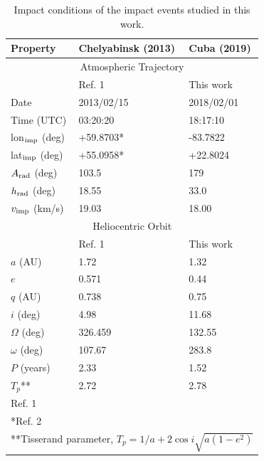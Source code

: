 \documentclass[fleqn,usenatbib]{mnras}
\newcommand{\sub}[1]{_{\rm #1}}
\newcommand{\vimp}{v\sub{imp}}
\begin{document}
\begin{table}
\centering
\begin{tabular}{lll}
\hline\hline
Property & Chelyabinsk (2013) & Cuba (2019)\\
\hline
\multicolumn{3}{c}{Atmospheric Trajectory}\\
\hline
                &  Ref. 1 & This work \\
Date            & 2013/02/15 & 2018/02/01 \\
Time (UTC)      & 03:20:20 & 18:17:10 \\
lon$_{\rm imp}$ (deg)       & +59.8703* & -83.7822 \\
lat$_{\rm imp}$ (deg)       & +55.0958* & +22.8024 \\
$A_{\rm rad}$ (deg)         & 103.5 & 179 \\
$h_{\rm rad}$ (deg)         & 18.55 & 33.0 \\
$\vimp$ (km/s)  & 19.03 & 18.00 \\
\hline
\multicolumn{3}{c}{Heliocentric Orbit}\\
\hline
                & Ref. 1 & This work \\
$a$ (AU)        & 1.72 & 1.32 \\
$e$             & 0.571 & 0.44 \\
$q$ (AU)        & 0.738 & 0.75 \\
$i$ (deg)       & 4.98 & 11.68 \\
$\Omega$ (deg)  & 326.459 & 132.55 \\
$\omega$ (deg)  & 107.67 & 283.8 \\
$P$ (years)     & 2.33 & 1.52 \\ 
$T_p$**           & 2.72 & 2.78 \\ 
\hline\hline
\multicolumn{3}{l}{\footnotesize Ref. 1 \citealt{Borovivcka2013}}\\
\multicolumn{3}{l}{*Ref. 2 \citealt{Zuluaga2013}}\\
\multicolumn{3}{l}{
**Tisserand parameter, $T_p=1/a+2\cos i\sqrt{a(1-e^2)}$ 
}
\end{tabular}
\caption{Impact conditions of the impact events studied in this work.\label{tab:events}}
\end{table}
\end{document}
